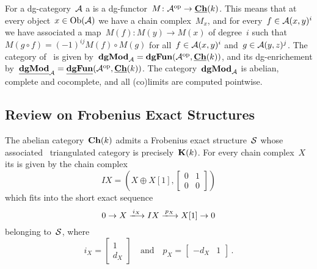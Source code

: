 \documentclass[a4paper,10pt]{scrartcl}
\begin{document}
For a dg-category~$\Acat$ a  is a dg-functor~$M \colon \mathcal{A}^{{\mathrm{op}}} \to \underline{\mathbf{Ch}}(k)$.
This means that at every object~$x \in \operatorname{Ob}(\mathcal{A})$ we have a chain complex~$M_x$, and for every~$f \in \mathcal{A}(x,y)^i$ we have associated a map~$M(f) \colon M(y) \to M(x)$ of degree~$i$ such that~$M(g \circ f) = (-1)^{ij} M(f) \circ M(g)$ for all~$f \in \mathcal{A}(x,y)^i$ and~$g \in \mathcal{A}(y,z)^j$.
The category of~{\dgmodules{$\Acat$}} is given by~$\mathbf{dgMod}_{\mathcal{A}} = \mathbf{dgFun}(\mathcal{A}^{{\mathrm{op}}}, \underline{\mathbf{Ch}}(k))$, and its dg-enrichement by~$\underline{\mathbf{dgMod}}_{\mathcal{A}} = \underline{\mathbf{dgFun}}(\mathcal{A}^{{\mathrm{op}}}, \underline{\mathbf{Ch}}(k))$.
The category~$\mathbf{dgMod}_{\mathcal{A}}$ is abelian, complete and cocomplete, and all (co)limits are computed pointwise.



\subsection{Review on Frobenius Exact Structures}

The abelian category~$\mathbf{Ch}(k)$ admits a Frobenius exact structure~$\Sfrob$ whose associated~{\stable{$\Sfrob$}} triangulated category is precisely~$\mathbf{K}(k)$.
For every chain complex~$X$ its  is given by the chain complex
\[
  IX
  =
  \left(
    X \oplus X[1],
    \begin{bmatrix}
      0 & 1 \\
      0 & 0
    \end{bmatrix}
  \right)
\]
which fits into the short exact sequence
\begin{equation}
  \label{ses of chain complexes}
  0
  \to
  X
  \xlongto{ i_X }
  IX
  \xlongto{ p_X }
  X[1]
  \to
  0
\end{equation}
belonging to~$\Sfrob$, where
\[
  i_X
  =
  \begin{bmatrix}
    1 \\
    d_X
  \end{bmatrix}
  \quad\text{and}\quad
  p_X
  =
  \begin{bmatrix}
    -d_X & 1
  \end{bmatrix} \,.
\]
\end{document}
